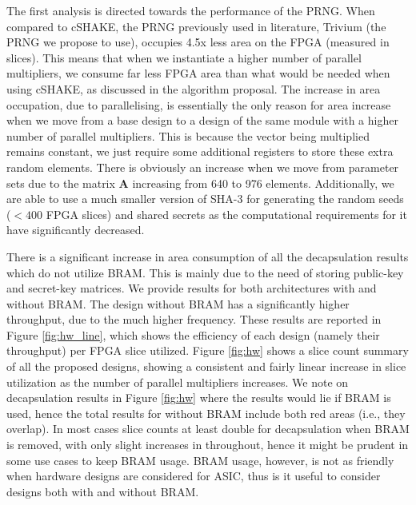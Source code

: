 The first analysis is directed towards the performance of the PRNG. When compared to cSHAKE, the PRNG previously used in literature, Trivium (the PRNG we propose to use), occupies 4.5x less area on the FPGA (measured in slices). This means that when we instantiate a higher number of parallel multipliers, we consume far less FPGA area than what would be needed when using cSHAKE, as discussed in the algorithm proposal. The increase in area occupation, due to parallelising, is essentially the only reason for area increase when we move from a base design to a design of the same module with a higher number of parallel multipliers. This is because the vector being multiplied remains constant, we just require some additional registers to store these extra random elements. There is obviously an increase when we move from parameter sets due to the matrix $\mathbf{A}$ increasing from 640 to 976 elements. Additionally, we are able to use a much smaller version of SHA-3 for generating the random seeds ($<400$ FPGA slices) and shared secrets as the computational requirements for it have significantly decreased.

There is a significant increase in area consumption of all the decapsulation results which do not utilize BRAM. This is mainly due to the need of storing public-key and secret-key matrices. We provide results for both architectures with and without BRAM. The design without BRAM has a significantly higher throughput, due to the much higher frequency. These results are reported in Figure \ref{fig:hw_line}, which shows the efficiency of each design (namely their throughput) per FPGA slice utilized. Figure \ref{fig:hw} shows a slice count summary of all the proposed designs, showing a consistent and fairly linear increase in slice utilization as the number of parallel multipliers increases. We note on decapsulation results in Figure \ref{fig:hw} where the results would lie if BRAM is used, hence the total results for without BRAM include both red areas (i.e., they overlap). In most cases slice counts at least double for decapsulation when BRAM is removed, with only slight increases in throughout, hence it might be prudent in some use cases to keep BRAM usage. BRAM usage, however, is not as friendly when hardware designs are considered for ASIC, thus is it useful to consider designs both with and without BRAM.

